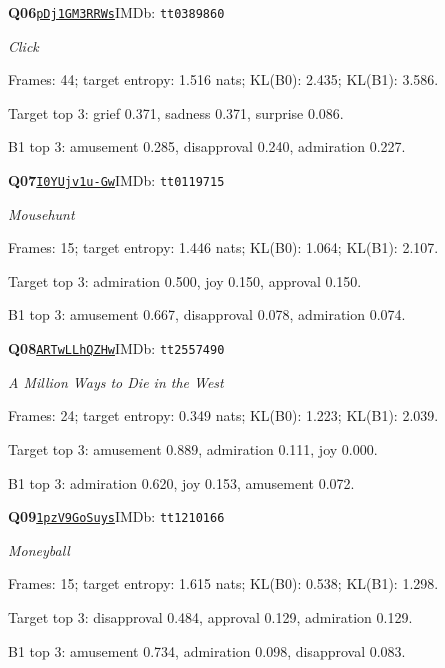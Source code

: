\par\noindent\begin{minipage}{\textwidth}\small
\textbf{Q06}\quad\href{https://www.youtube.com/watch?v=pDj1GM3RRWs}{\texttt{pDj1GM3RRWs}}\quad IMDb: \texttt{tt0389860}\par
\textit{Click}\par
Frames: 44; target entropy: 1.516 nats; KL(B0): 2.435; KL(B1): 3.586.\par
Target top 3: grief 0.371, sadness 0.371, surprise 0.086.\par
B1 top 3: amusement 0.285, disapproval 0.240, admiration 0.227.\par
\end{minipage}\par\medskip
\par\noindent\begin{minipage}{\textwidth}\small
\textbf{Q07}\quad\href{https://www.youtube.com/watch?v=I0YUjv1u-Gw}{\texttt{I0YUjv1u-Gw}}\quad IMDb: \texttt{tt0119715}\par
\textit{Mousehunt}\par
Frames: 15; target entropy: 1.446 nats; KL(B0): 1.064; KL(B1): 2.107.\par
Target top 3: admiration 0.500, joy 0.150, approval 0.150.\par
B1 top 3: amusement 0.667, disapproval 0.078, admiration 0.074.\par
\end{minipage}\par\medskip
\par\noindent\begin{minipage}{\textwidth}\small
\textbf{Q08}\quad\href{https://www.youtube.com/watch?v=ARTwLLhQZHw}{\texttt{ARTwLLhQZHw}}\quad IMDb: \texttt{tt2557490}\par
\textit{A Million Ways to Die in the West}\par
Frames: 24; target entropy: 0.349 nats; KL(B0): 1.223; KL(B1): 2.039.\par
Target top 3: amusement 0.889, admiration 0.111, joy 0.000.\par
B1 top 3: admiration 0.620, joy 0.153, amusement 0.072.\par
\end{minipage}\par\medskip
\par\noindent\begin{minipage}{\textwidth}\small
\textbf{Q09}\quad\href{https://www.youtube.com/watch?v=1pzV9GoSuys}{\texttt{1pzV9GoSuys}}\quad IMDb: \texttt{tt1210166}\par
\textit{Moneyball}\par
Frames: 15; target entropy: 1.615 nats; KL(B0): 0.538; KL(B1): 1.298.\par
Target top 3: disapproval 0.484, approval 0.129, admiration 0.129.\par
B1 top 3: amusement 0.734, admiration 0.098, disapproval 0.083.\par
\end{minipage}\par\medskip
